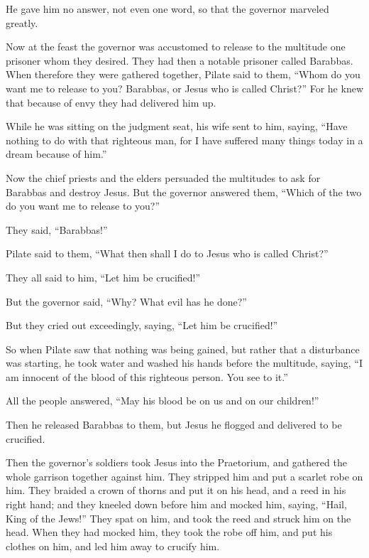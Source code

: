  He gave him no answer, not even one word, so that the
governor marveled greatly.

 Now at the feast the governor was accustomed to release
to the multitude one prisoner whom they desired.  They
had then a notable prisoner called Barabbas.  When
therefore they were gathered together, Pilate said to them, ``Whom do
you want me to release to you? Barabbas, or Jesus who is called
Christ?''  For he knew that because of envy they had
delivered him up.

 While he was sitting on the judgment seat, his wife sent
to him, saying, ``Have nothing to do with that righteous man, for I have
suffered many things today in a dream because of him.''

 Now the chief priests and the elders persuaded the
multitudes to ask for Barabbas and destroy Jesus.  But
the governor answered them, ``Which of the two do you want me to release
to you?''

They said, ``Barabbas!''

 Pilate said to them, ``What then shall I do to Jesus who
is called Christ?''

They all said to him, ``Let him be crucified!''

 But the governor said, ``Why? What evil has he done?''

But they cried out exceedingly, saying, ``Let him be crucified!''

 So when Pilate saw that nothing was being gained, but
rather that a disturbance was starting, he took water and washed his
hands before the multitude, saying, ``I am innocent of the blood of this
righteous person. You see to it.''

 All the people answered, ``May his blood be on us and on
our children!''

 Then he released Barabbas to them, but Jesus he flogged
and delivered to be crucified.

 Then the governor's soldiers took Jesus into the
Praetorium, and gathered the whole garrison together against him.
 They stripped him and put a scarlet robe on him.
 They braided a crown of thorns and put it on his head,
and a reed in his right hand; and they kneeled down before him and
mocked him, saying, ``Hail, King of the Jews!''  They
spat on him, and took the reed and struck him on the head.
 When they had mocked him, they took the robe off him,
and put his clothes on him, and led him away to crucify him.


